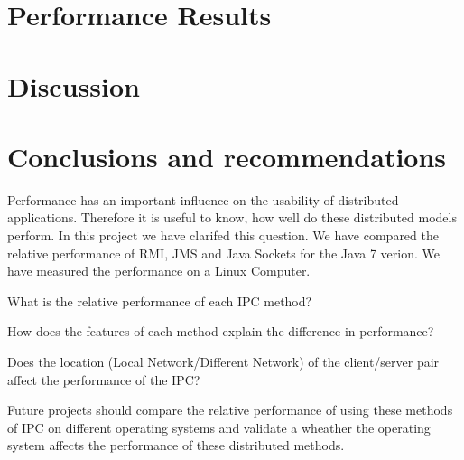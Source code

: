 \documentclass{article}
\begin{document}
\section{Performance Results}






\section{Discussion}



\section{Conclusions and recommendations}

Performance has an important influence on the usability of distributed applications. Therefore it is useful to know, how well do these distributed models perform. In this project we have clarifed this question. We have compared the relative performance of RMI, JMS and Java Sockets for the Java 7 verion. We have measured the performance on a Linux Computer.

What is the relative performance of each IPC method?


How does the features of each method explain the difference in performance?


Does the location (Local Network/Different Network) of the client/server pair affect the performance of the IPC?



Future projects should compare the relative performance of using these methods of IPC on different operating systems and validate a wheather the operating system affects the performance of these distributed methods.







\end{document}
